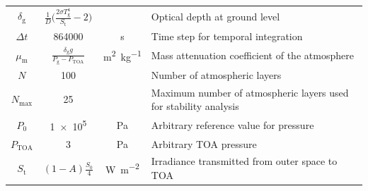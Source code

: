 \documentclass[a4paper,10pt,twocolumn,\classoptions]{article}
\newcommand{\PTOA}{P_\text{TOA}}
\begin{document}
\begin{table}[h]
\begin{tabular}[b]{cccp{}}
    \midrule
    $\delta_\text{g}$ & $\frac{1}{D} \Big( \frac{2 \sigma T_\text{g}^4}{S_\text{t}} - 2 \Big)$ &                                                   & Optical depth at ground level                                                             \\
    $\Delta t$        & \num{864000}                                                           & \unit{\second}                                    & Time step for temporal integration                                                        \\
    $\mu_\text{m}$    & $\frac{\delta_\text{g} g}{P_\text{g} - \PTOA}$                         & \unit{\square\metre\per\kilogram}                 & Mass attenuation coefficient of the atmosphere                                            \\
    $N$               & \num{100}                                                              &                                                   & Number of atmospheric layers                                                              \\
    $N_\text{max}$    & \num{25}                                                               &                                                   & Maximum number of atmospheric layers used for stability analysis                          \\
    $P_0$             & \num{1e5}                                                              & \unit{\pascal}                                    & Arbitrary reference value for pressure                                                    \\
    $\PTOA$           & \num{3}                                                                & \unit{\pascal}                                    & Arbitrary TOA pressure                                                                    \\
    $S_\text{t}$      & $(1 - A) \frac{S_0}{4}$                                                & \unit{\watt\per\square\metre}                     & Irradiance transmitted from outer space to TOA                                            \\

\end{tabular}
\end{table}
\end{document}
